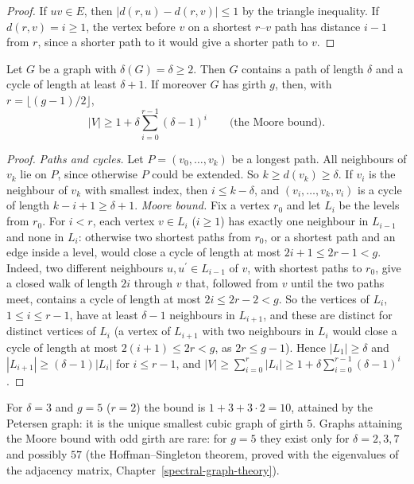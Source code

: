 \begin{proof}
If $uv \in E$, then $|d(r, u) - d(r, v)| \leq 1$ by the triangle inequality. If $d(r, v) = i \geq 1$, the vertex before $v$ on a shortest $r$--$v$ path has distance $i - 1$ from $r$, since a shorter
path to it would give a shorter path to $v$.
\end{proof}

\begin{proposition}\label{graph-theory:proposition-min-degree}
Let $G$ be a graph with $\delta(G) = \delta \geq 2$. Then $G$ contains a path of length $\delta$ and a cycle of length at least $\delta + 1$. If moreover $G$ has girth $g$, then, with
$r = \lfloor(g - 1)/2\rfloor$,
\[
|V| \geq 1 + \delta\sum_{i=0}^{r-1}(\delta - 1)^i \qquad \text{(the Moore bound)}.
\]
\end{proposition}

\begin{proof}
\emph{Paths and cycles.} Let $P = (v_0, \ldots, v_k)$ be a longest path. All neighbours of $v_k$ lie on $P$, since otherwise $P$ could be extended. So $k \geq d(v_k) \geq \delta$. If $v_i$ is the
neighbour of $v_k$ with smallest index, then $i \leq k - \delta$, and $(v_i, \ldots, v_k, v_i)$ is a cycle of length $k - i + 1 \geq \delta + 1$.
\emph{Moore bound.} Fix a vertex $r_0$ and let $L_i$ be the levels from $r_0$. For $i < r$, each vertex $v \in L_i$ ($i \geq 1$) has exactly one neighbour in $L_{i-1}$ and none in $L_i$:
otherwise two shortest paths from $r_0$, or a shortest path and an edge inside a level, would close a cycle of length at most $2i + 1 \leq 2r - 1 < g$. Indeed, two different neighbours
$u, u^{\prime} \in L_{i-1}$ of $v$, with shortest paths to $r_0$, give a closed walk of length $2i$ through $v$ that, followed from $v$ until the two paths meet, contains a cycle of length at most
$2i \leq 2r - 2 < g$. So the vertices of $L_i$, $1 \leq i \leq r - 1$, have at least $\delta - 1$ neighbours in $L_{i+1}$, and these are distinct for distinct vertices of $L_i$ (a vertex of
$L_{i+1}$ with two neighbours in $L_i$ would close a cycle of length at most $2(i + 1) \leq 2r < g$, as $2r \leq g - 1$). Hence $|L_1| \geq \delta$ and $|L_{i+1}| \geq (\delta - 1)|L_i|$
for $i \leq r - 1$, and $|V| \geq \sum_{i=0}^{r}|L_i| \geq 1 + \delta\sum_{i=0}^{r-1}(\delta - 1)^i$.
\end{proof}

For $\delta = 3$ and $g = 5$ ($r = 2$) the bound is $1 + 3 + 3 \cdot 2 = 10$, attained by the Petersen graph: it is the unique smallest cubic graph of girth $5$. Graphs attaining the Moore bound with
odd girth are rare: for $g = 5$ they exist only for $\delta = 2, 3, 7$ and possibly $57$ (the Hoffman--Singleton theorem, proved with the eigenvalues of the adjacency matrix,
Chapter~\ref{spectral-graph-theory}).

